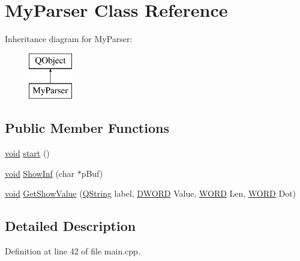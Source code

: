 \hypertarget{class_my_parser}{\section{My\-Parser Class Reference}
\label{class_my_parser}
}
Inheritance diagram for My\-Parser\-:\begin{figure}[H]
\begin{center}
\leavevmode
\includegraphics[height=2.000000cm]{class_my_parser}
\end{center}
\end{figure}
\subsection*{Public Member Functions}
\begin{DoxyCompactItemize}
\item 
\hyperlink{group___u_a_v_objects_plugin_ga444cf2ff3f0ecbe028adce838d373f5c}{void} \hyperlink{class_my_parser_aeb58449267acffed06d3b33f8bdc926a}{start} ()
\item 
\hyperlink{group___u_a_v_objects_plugin_ga444cf2ff3f0ecbe028adce838d373f5c}{void} \hyperlink{class_my_parser_a2251be7961e7f29ca0383e82f378df63}{Show\-Inf} (char $\ast$p\-Buf)
\item 
\hyperlink{group___u_a_v_objects_plugin_ga444cf2ff3f0ecbe028adce838d373f5c}{void} \hyperlink{class_my_parser_a1e4c1803a004e7ef13142cbbf26aba7a}{Get\-Show\-Value} (\hyperlink{group___u_a_v_objects_plugin_gab9d252f49c333c94a72f97ce3105a32d}{Q\-String} label, \hyperlink{gcs_2src_2experimental_2_power_log6_s_2main_8cpp_ad342ac907eb044443153a22f964bf0af}{D\-W\-O\-R\-D} Value, \hyperlink{gcs_2src_2experimental_2_power_log6_s_2main_8cpp_a197942eefa7db30960ae396d68339b97}{W\-O\-R\-D} Len, \hyperlink{gcs_2src_2experimental_2_power_log6_s_2main_8cpp_a197942eefa7db30960ae396d68339b97}{W\-O\-R\-D} Dot)
\end{DoxyCompactItemize}


\subsection{Detailed Description}


Definition at line 42 of file main.\-cpp.



